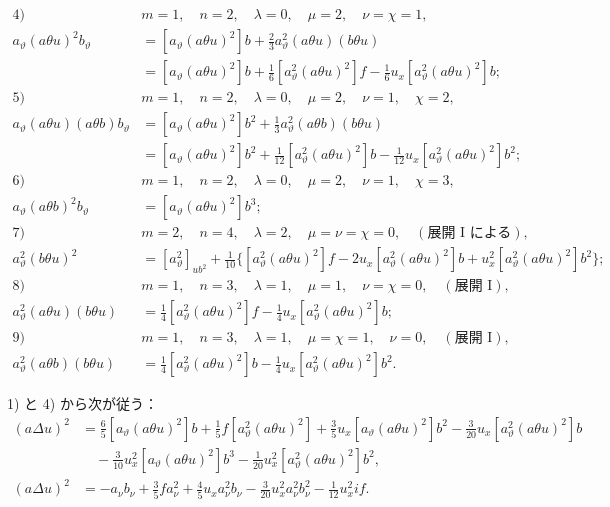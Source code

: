 \documentclass[11pt]{article}
\begin{document}
\begin{align*}
\text{4)}\quad&m=1,\quad n=2,\quad \lambda=0,\quad \mu=2,\quad \nu=\chi=1,\\
a_\vartheta(a\theta u)^2b_\vartheta
&=[a_\vartheta(a\theta u)^2]b+\frac23a_\vartheta^2(a\theta u)(b\theta u)\\
&=[a_\vartheta(a\theta u)^2]b+\frac16[a_\vartheta^2(a\theta u)^2]f-\frac16u_x[a_\vartheta^2(a\theta u)^2]b;\\[.6em]
\text{5)}\quad&m=1,\quad n=2,\quad \lambda=0,\quad \mu=2,\quad \nu=1,\quad \chi=2,\\
a_\vartheta(a\theta u)(a\theta b)b_\vartheta
&=[a_\vartheta(a\theta u)^2]b^2+\frac13a_\vartheta^2(a\theta b)(b\theta u)\\
&=[a_\vartheta(a\theta u)^2]b^2+\frac1{12}[a_\vartheta^2(a\theta u)^2]b-\frac1{12}u_x[a_\vartheta^2(a\theta u)^2]b^2;\\[.6em]
\text{6)}\quad&m=1,\quad n=2,\quad \lambda=0,\quad \mu=2,\quad \nu=1,\quad \chi=3,\\
a_\vartheta(a\theta b)^2b_\vartheta&=[a_\vartheta(a\theta u)^2]b^3;\\[.6em]
\text{7)}\quad&m=2,\quad n=4,\quad \lambda=2,\quad \mu=\nu=\chi=0,\quad (\text{展開 I による}),\\
a_\vartheta^2(b\theta u)^2&=[a_\vartheta^2]_{ub^2}+\frac1{10}\{[a_\vartheta^2(a\theta u)^2]f-2u_x[a_\vartheta^2(a\theta u)^2]b+u_x^2[a_\vartheta^2(a\theta u)^2]b^2\};\\[.6em]
\text{8)}\quad&m=1,\quad n=3,\quad \lambda=1,\quad \mu=1,\quad \nu=\chi=0,\quad (\text{展開 I}),\\
a_\vartheta^2(a\theta u)(b\theta u)&=\frac14[a_\vartheta^2(a\theta u)^2]f-\frac14u_x[a_\vartheta^2(a\theta u)^2]b;\\[.6em]
\text{9)}\quad&m=1,\quad n=3,\quad \lambda=1,\quad \mu=\chi=1,\quad \nu=0,\quad (\text{展開 I}),\\
a_\vartheta^2(a\theta b)(b\theta u)&=\frac14[a_\vartheta^2(a\theta u)^2]b-\frac14u_x[a_\vartheta^2(a\theta u)^2]b^2.
\end{align*}

1) と 4) から次が従う：
\[
\begin{aligned}
(a\Delta u)^2
&=\frac65[a_\vartheta(a\theta u)^2]b+\frac15f[a_\vartheta^2(a\theta u)^2]+\frac35u_x[a_\vartheta(a\theta u)^2]b^2-\frac3{20}u_x[a_\vartheta^2(a\theta u)^2]b\\
&\quad-\frac3{10}u_x^2[a_\vartheta(a\theta u)^2]b^3-\frac1{20}u_x^2[a_\vartheta^2(a\theta u)^2]b^2,\\
(a\Delta u)^2
&=-a_\nu b_\nu+\frac35fa_\nu^2+\frac45u_xa_\nu^2b_\nu-\frac3{20}u_x^2a_\nu^2b_\nu^2-\frac1{12}u_x^2if.
\end{aligned}
\]
\end{document}
